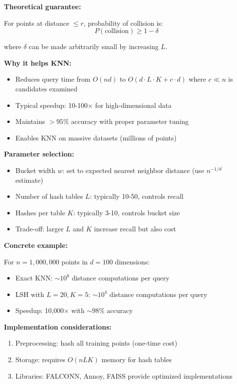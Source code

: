 \documentclass[12pt]{article}
\begin{document}
\begin{solution}
\textbf{Theoretical guarantee:}

For points at distance \(\leq r\), probability of collision is:
\[
P(\text{collision}) \geq 1 - \delta
\]

where \(\delta\) can be made arbitrarily small by increasing \(L\).

\textbf{Why it helps KNN:}

\begin{itemize}
    \item Reduces query time from \(O(nd)\) to \(O(d \cdot L \cdot K + c \cdot d)\) where \(c \ll n\) is candidates examined
    \item Typical speedup: 10-100× for high-dimensional data
    \item Maintains \(>95\%\) accuracy with proper parameter tuning
    \item Enables KNN on massive datasets (millions of points)
\end{itemize}

\textbf{Parameter selection:}
\begin{itemize}
    \item Bucket width \(w\): set to expected nearest neighbor distance (use \(n^{-1/d}\) estimate)
    \item Number of hash tables \(L\): typically 10-50, controls recall
    \item Hashes per table \(K\): typically 3-10, controls bucket size
    \item Trade-off: larger \(L\) and \(K\) increase recall but also cost
\end{itemize}

\textbf{Concrete example:}

For \(n=1,000,000\) points in \(d=100\) dimensions:
\begin{itemize}
    \item Exact KNN: \(\sim 10^8\) distance computations per query
    \item LSH with \(L=20, K=5\): \(\sim 10^4\) distance computations per query
    \item Speedup: 10,000× with \(\sim 98\%\) accuracy
\end{itemize}

\textbf{Implementation considerations:}
\begin{enumerate}
    \item Preprocessing: hash all training points (one-time cost)
    \item Storage: requires \(O(nLK)\) memory for hash tables
    \item Libraries: FALCONN, Annoy, FAISS provide optimized implementations
\end{enumerate}


\end{solution}
\end{document}
